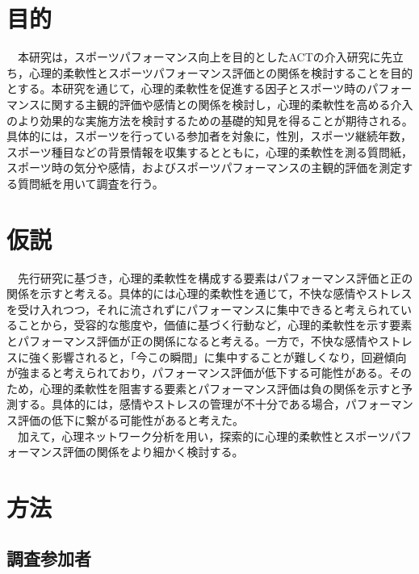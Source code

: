 \documentclass[12pt,a4paper,xelatex,ja=standard]{bxjsarticle}
\begin{document}
\hypertarget{ux76eeux7684}{%
\section{目的}\label{ux76eeux7684}}

　本研究は，スポーツパフォーマンス向上を目的としたACTの介入研究に先立ち，心理的柔軟性とスポーツパフォーマンス評価との関係を検討することを目的とする。本研究を通じて，心理的柔軟性を促進する因子とスポーツ時のパフォーマンスに関する主観的評価や感情との関係を検討し，心理的柔軟性を高める介入のより効果的な実施方法を検討するための基礎的知見を得ることが期待される。具体的には，スポーツを行っている参加者を対象に，性別，スポーツ継続年数，スポーツ種目などの背景情報を収集するとともに，心理的柔軟性を測る質問紙，スポーツ時の気分や感情，およびスポーツパフォーマンスの主観的評価を測定する質問紙を用いて調査を行う。

\hypertarget{ux4eeeux8aac}{%
\section{仮説}\label{ux4eeeux8aac}}

　先行研究に基づき，心理的柔軟性を構成する要素はパフォーマンス評価と正の関係を示すと考える。具体的には心理的柔軟性を通じて，不快な感情やストレスを受け入れつつ，それに流されずにパフォーマンスに集中できると考えられていることから，受容的な態度や，価値に基づく行動など，心理的柔軟性を示す要素とパフォーマンス評価が正の関係になると考える。一方で，不快な感情やストレスに強く影響されると，「今この瞬間」に集中することが難しくなり，回避傾向が強まると考えられており，パフォーマンス評価が低下する可能性がある。そのため，心理的柔軟性を阻害する要素とパフォーマンス評価は負の関係を示すと予測する。具体的には，感情やストレスの管理が不十分である場合，パフォーマンス評価の低下に繋がる可能性があると考えた。\\
　加えて，心理ネットワーク分析を用い，探索的に心理的柔軟性とスポーツパフォーマンス評価の関係をより細かく検討する。

\clearpage

\hypertarget{ux65b9ux6cd5}{%
\section{方法}\label{ux65b9ux6cd5}}

\hypertarget{ux8abfux67fbux53c2ux52a0ux8005}{%
\subsection{調査参加者}\label{ux8abfux67fbux53c2ux52a0ux8005}}
\end{document}
